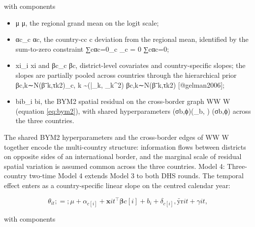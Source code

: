 \documentclass{article}
\begin{document}
with components

\begin{itemize}

\item μ\mu
μ, the regional grand mean on the logit scale;

\item αc\alpha_{c}
αc​, the country-cc
c deviation from the regional mean, identified by the sum-to-zero constraint ∑cαc=0\sum_c \alpha_c = 0
∑c​αc​=0;

\item xi_i
xi​ and βc\bm{\beta}_c
βc​, district-level covariates and country-specific slopes; the slopes are partially pooled across countries through the hierarchical prior βc,k∼N(βˉk,τk2)\beta_{c, k} \sim {}(\bar{\beta}_k, \tau_k^{2})
βc,k​∼N(βˉ​k​,τk2​) [@gelman2006];

\item bib_i
bi​, the BYM2 spatial residual on the cross-border graph WW
W (equation \ref{eq:bym2}), with shared hyperparameters (σb,ϕ)(\sigma_b, \phi)
(σb​,ϕ) across the three countries.

\end{itemize}

The shared BYM2 hyperparameters and the cross-border edges of WW W
together encode the multi-country structure: information flows between
districts on opposite sides of an international border, and the marginal
scale of residual spatial variation is assumed common across the three
countries. Model 4: Three-country two-time \label{sec:m4} Model 4
extends Model 3 to both DHS rounds. The temporal effect enters as a
country-specific linear slope on the centred calendar year:

\begin{equation}

\theta_{it} ;=; \mu + \alpha_{c[i]} + \mathbf{x}{it}^{\top} \bm{\beta}{c[i]} + b_i + \delta_{c[i]} , \widetilde{\text{yr}}{it} + \gamma{it},

\label{eq:m4}

\end{equation}

with components
\end{document}
